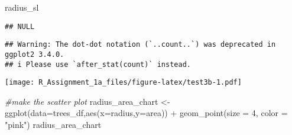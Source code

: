 \documentclass[
]{article}
\newenvironment{Shaded}{\begin{snugshade}}{\end{snugshade}}
\newcommand{\AttributeTok}[1]{\textcolor[rgb]{0.77,0.63,0.00}{#1}}
\newcommand{\CommentTok}[1]{\textcolor[rgb]{0.56,0.35,0.01}{\textit{#1}}}
\newcommand{\DecValTok}[1]{\textcolor[rgb]{0.00,0.00,0.81}{#1}}
\newcommand{\FunctionTok}[1]{\textcolor[rgb]{0.00,0.00,0.00}{#1}}
\newcommand{\NormalTok}[1]{#1}
\newcommand{\OtherTok}[1]{\textcolor[rgb]{0.56,0.35,0.01}{#1}}
\newcommand{\SpecialCharTok}[1]{\textcolor[rgb]{0.00,0.00,0.00}{#1}}
\newcommand{\StringTok}[1]{\textcolor[rgb]{0.31,0.60,0.02}{#1}}
\begin{document}
\begin{Shaded}
\begin{Highlighting}[]
\NormalTok{radius\_sl}
\end{Highlighting}
\end{Shaded}

\begin{verbatim}
## NULL
\end{verbatim}

\begin{Shaded}
\end{Shaded}

\begin{verbatim}
## Warning: The dot-dot notation (`..count..`) was deprecated in ggplot2 3.4.0.
## i Please use `after_stat(count)` instead.
\end{verbatim}

\texttt{[image: R\_Assignment\_1a\_files/figure-latex/test3b-1.pdf]}

\begin{Shaded}
\begin{Highlighting}[]
\CommentTok{\#make the scatter plot}
\NormalTok{radius\_area\_chart }\OtherTok{\textless{}{-}} \FunctionTok{ggplot}\NormalTok{(}\AttributeTok{data=}\NormalTok{trees\_df,}\FunctionTok{aes}\NormalTok{(}\AttributeTok{x=}\NormalTok{radius,}\AttributeTok{y=}\NormalTok{area)) }\SpecialCharTok{+}
  \FunctionTok{geom\_point}\NormalTok{(}\AttributeTok{size =} \DecValTok{4}\NormalTok{, }\AttributeTok{color =} \StringTok{"pink"}\NormalTok{)}
\NormalTok{radius\_area\_chart}
\end{Highlighting}
\end{Shaded}
\end{document}
